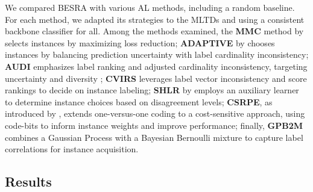 \documentclass[letterpaper]{article} %
\begin{document}
We compared BESRA with various AL methods, including a random baseline. 
For each method, we adapted its strategies to the MLTDs and using a consistent backbone classifier for all.
Among the methods examined, the \textbf{MMC} method by \citet{mmc2009} selects instances by maximizing loss reduction; \textbf{ADAPTIVE} by \citet{adaptive2013} chooses instances by balancing prediction uncertainty with label cardinality inconsistency; \textbf{AUDI} emphasizes label ranking and adjusted cardinality inconsistency, targeting uncertainty and diversity \cite{6729601}; \textbf{CVIRS} \cite{REYES2018494} leverages label vector inconsistency and score rankings to decide on instance labeling; \textbf{SHLR} by \citet{pmlr-v20-hung11} employs an auxiliary learner to determine instance choices based on disagreement levels; \textbf{CSRPE}, as introduced by \citet{10.1007/978-3-319-93034-3_12}, extends one-versus-one coding to a cost-sensitive approach, using code-bits to inform instance weights and improve performance; finally, \textbf{GPB2M} \cite{gaupb2_2021} combines a Gaussian Process with a Bayesian Bernoulli mixture to capture label correlations for instance acquisition.







\subsection{Results}
\end{document}
